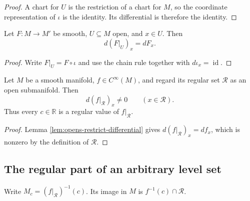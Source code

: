 \begin{proof}

\sketch A chart for $U$ is the restriction of a chart for $M$, so the coordinate
representation of $\iota$ is the identity. Its differential is therefore the identity.
\end{proof}

\begin{lemma}
\label{lem:opens-restrict-differential}





Let $F\colon M\to M'$ be smooth, $U\subseteq M$ open, and $x\in U$. Then
\[
d(F|_U)_x=dF_x.
\]
\end{lemma}

\begin{proof}

\sketch Write $F|_U=F\circ\iota$ and use the chain rule together with
$d\iota_x=\operatorname{id}$.
\end{proof}

\begin{lemma}
\label{lem:regular-restrict-regular-value}





Let $M$ be a smooth manifold, $f\in C^\infty(M)$, and regard its regular set
$\mathcal R$ as an open submanifold. Then
\[
d(f|_{\mathcal R})_x\ne0\qquad(x\in\mathcal R).
\]
Thus every $c\in\mathbb R$ is a regular value of $f|_{\mathcal R}$.
\end{lemma}

\begin{proof}

\sketch Lemma \ref{lem:opens-restrict-differential} gives
$d(f|_{\mathcal R})_x=df_x$, which is nonzero by the definition of $\mathcal R$.
\end{proof}

\subsection*{The regular part of an arbitrary level set}

Write $M_c=(f|_{\mathcal R})^{-1}(c)$. Its image in $M$ is
$f^{-1}(c)\cap\mathcal R$.

